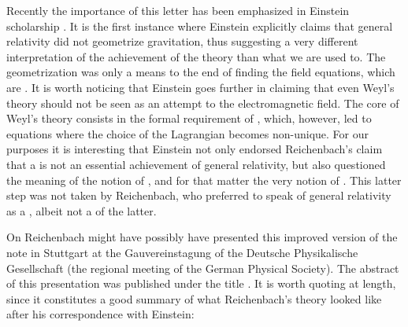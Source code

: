 \documentclass[draft]{article}
\begin{document}
Recently the importance of this letter has been emphasized in Einstein scholarship \citep{Lehmkuhl2014}. It is the first instance where Einstein explicitly claims that general relativity did not geometrize gravitation, thus suggesting a very different interpretation of the achievement of the theory than what we are used to. The geometrization was only a means to the end of finding the field equations, which are . It is worth noticing that Einstein goes further in claiming that even Weyl's theory should not be seen as an attempt to  the electromagnetic field. The core of Weyl's theory consists in the formal requirement of %
%
%
 , which, however, led to equations where the choice of the Lagrangian becomes non-unique. For our purposes it is interesting that Einstein not only endorsed Reichenbach's claim that a  is not an essential achievement of general relativity, but also questioned the meaning of the notion of , and for that matter the very notion of  \citep{Lehmkuhl2014}. This latter step was not taken by Reichenbach, who preferred to speak of general relativity as a , albeit not a  of the latter.

On  Reichenbach might have possibly have presented this improved version of the note in Stuttgart at the Gauvereinstagung of the Deutsche Physikalische Gesellschaft (the regional meeting of the German Physical Society). The abstract of this presentation was published under the title  \citep{Reichenbach1926d}. It is worth quoting at length, since it constitutes a good summary of what Reichenbach's theory looked like after his correspondence with Einstein:
\end{document}
